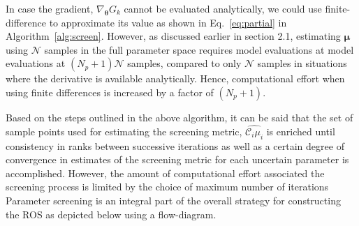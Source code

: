 \bigskip

In case the gradient, $\nabla_{\bm{\theta}}G_k$ cannot be evaluated analytically, we could use finite-difference
to approximate its value as shown in Eq.~\ref{eq:partial} in Algorithm~\ref{alg:screen}. However, as discussed earlier
in section 2.1, estimating $\bm{\mu}$  using $\mathcal{N}$ samples in the full parameter space requires 
model evaluations at model evaluations at $(N_p+1)\mathcal{N}$ samples, compared to only $\mathcal{N}$ samples in 
situations where the derivative is available analytically. Hence, computational effort when using finite differences
is increased by a factor of $(N_p+1)$. 

Based on the steps outlined in the above algorithm, it can be said that the set of sample points used for
estimating the screening metric, $\widehat{\mathcal{C}_i\mu_i}$ is enriched until consistency in ranks
between successive iterations as well as a certain degree of convergence in estimates of the screening 
metric for each uncertain parameter is accomplished. However, the amount of computational effort associated
the screening process is limited by the choice of maximum number of iterations Parameter
screening is an integral part of the overall strategy for constructing the ROS as 
depicted below using a flow-diagram. 

\bigskip

